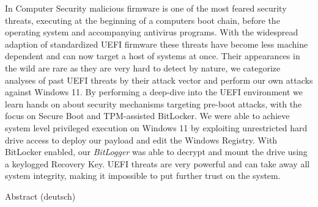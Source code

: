 

\label{sec:abstract}

In Computer Security malicious firmware is one of the most feared security threats, executing at the beginning of a computers boot chain, before the operating system and accompanying antivirus programs. With the widespread adaption of standardized \acs{UEFI} firmware these threats have become less machine dependent and can now target a host of systems at once.
Their appearances in the wild are rare as they are very hard to detect by nature, we categorize analyses of past UEFI threats by their attack vector and perform our own attacks against Windows 11.
By performing a deep-dive into the UEFI environment we learn hands on about security mechanisms targeting pre-boot attacks, with the focus on Secure Boot and TPM-assisted BitLocker.
We were able to achieve system level privileged execution on Windows 11 by exploiting unrestricted hard drive access to deploy our payload and edit the Windows Registry. With BitLocker enabled, our \emph{BitLogger} was able to decrypt and mount the drive using a keylogged Recovery Key.
UEFI threats are very powerful and can take away all system integrity, making it impossible to put further trust on the system.

\vspace*{20mm}

{Abstract (deutsch)}
\label{sec:abstract-diff}

\blindtext
